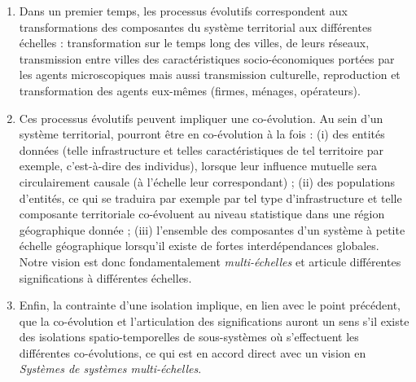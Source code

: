 \documentclass[11pt]{article}
\newcommand{\noun}[1]{\textsc{#1}}
\begin{document}
\begin{enumerate}
    \item Dans un premier temps, les processus évolutifs correspondent aux transformations des composantes du système territorial aux différentes échelles : transformation sur le temps long des villes, de leurs réseaux, transmission entre villes des caractéristiques socio-économiques portées par les agents microscopiques mais aussi transmission culturelle, reproduction et transformation des agents eux-mêmes (firmes, ménages, opérateurs).%
	\item Ces processus évolutifs peuvent impliquer une co-évolution. Au sein d'un système territorial, pourront être en co-évolution à la fois : (i) des entités données (telle infrastructure et telles caractéristiques de tel territoire par exemple, c'est-à-dire des individus), lorsque leur influence mutuelle sera circulairement causale (à l'échelle leur correspondant) ; (ii) des populations d'entités, ce qui se traduira par exemple par tel type d'infrastructure et telle composante territoriale co-évoluent au niveau statistique dans une région géographique donnée ; (iii) l'ensemble des composantes d'un système à petite échelle géographique lorsqu'il existe de fortes interdépendances globales. Notre vision est donc fondamentalement \emph{multi-échelles} et articule différentes significations à différentes échelles.
	\item Enfin, la contrainte d'une isolation implique, en lien avec le point précédent, que la co-évolution et l'articulation des significations auront un sens s'il existe des isolations spatio-temporelles de sous-systèmes où s'effectuent les différentes co-évolutions, ce qui est en accord direct avec un vision en \emph{Systèmes de systèmes multi-échelles}.
\end{enumerate}


\end{document}

